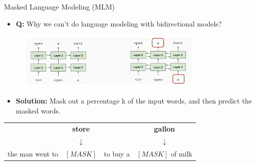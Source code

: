 \documentclass[serif, aspectratio=169]{beamer}
\begin{document}
\begin{frame}{Masked Language Modeling (MLM)}
    \begin{itemize}
        \item \textbf{Q:} Why we can’t do language modeling with bidirectional models?
    \end{itemize}
    
    \begin{figure}[h]
        \centering
        \includegraphics[width=0.8\textwidth]{Figures/MLM.png}
    \end{figure}
    
    \begin{itemize}
        \item \textbf{Solution:} Mask out a percentage k of the input words, and then predict the masked words.
    \end{itemize}
    
    \vspace{0.3cm}
    
    \begin{center}
        \begin{tabular}{c c c c}
            & \textbf{store} && \textbf{gallon} \\
            & $\downarrow$ && $\downarrow$ \\
            the man went to & $[MASK]$ & to buy a & $[MASK]$ of milk
        \end{tabular}
    \end{center}
\end{frame}
\end{document}
